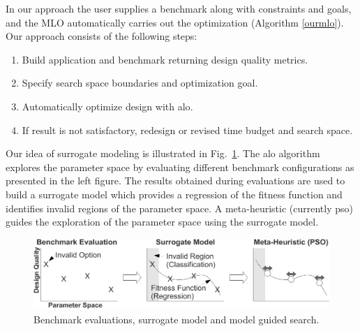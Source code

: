 \documentclass[10pt,conference,a4paper]{IEEEtran}
\begin{document}

In our approach the user supplies a benchmark along with constraints and goals, and the MLO automatically carries out the optimization (Algorithm \ref{ourmlo}). Our approach consists of the following steps:

\begin{enumerate}\addtolength{\itemsep}{-0.1\baselineskip}  
\item Build application and benchmark returning design quality metrics.
\item Specify search space boundaries and optimization goal.
\item Automatically optimize design with \ac{alo}.
\item If result is not satisfactory, redesign or revised time budget and search space.

\end{enumerate}

Our idea of surrogate modeling is illustrated in Fig.~\ref{fig:ouridea}. The \ac{alo} algorithm explores the parameter space by evaluating different benchmark configurations as presented in the left figure. The results obtained during evaluations are used to build a surrogate model which provides a regression of the fitness function and identifies invalid regions of the parameter space. A meta-heuristic (currently \ac{pso}) guides the exploration of the parameter space using the surrogate model. 



  \begin{figure}
     \centering
\includegraphics[width=1.0\textwidth]{./graphics/surrogate_tobias.pdf}
        \caption{Benchmark evaluations, surrogate model and model guided search.}     
           \label{fig:ouridea}
  \end{figure}
 
\end{document}
